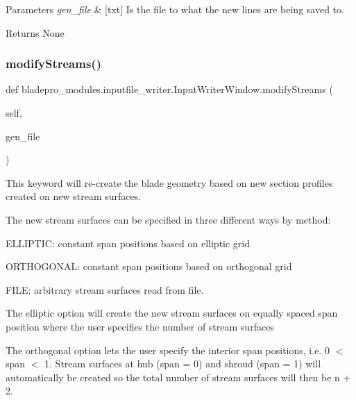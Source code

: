 \begin{DoxyParams}{Parameters}
{\em gen\+\_\+file} & \mbox{[}txt\mbox{]} Is the file to what the new lines are being saved to. \\
\hline
\end{DoxyParams}
\begin{DoxyReturn}{Returns}
None 
\end{DoxyReturn}
\hypertarget{a00073_a66f6209a0c4caa0ba5e25b5fd913eff5}{}\label{a00073_a66f6209a0c4caa0ba5e25b5fd913eff5} 
\subsubsection{\texorpdfstring{modify\+Streams()}{modifyStreams()}}
{\footnotesize\ttfamily def bladepro\+\_\+modules.\+inputfile\+\_\+writer.\+Input\+Writer\+Window.\+modify\+Streams (\begin{DoxyParamCaption}\item[{}]{self,  }\item[{}]{gen\+\_\+file }\end{DoxyParamCaption})}



This keyword will re-\/create the blade geometry based on new section profiles created on new stream surfaces. 

The new stream surfaces can be specified in three different ways by method\+:

\begin{DoxyItemize}
\item {\ttfamily E\+L\+L\+I\+P\+T\+IC\+:} constant span positions based on elliptic grid \item {\ttfamily O\+R\+T\+H\+O\+G\+O\+N\+AL\+:} constant span positions based on orthogonal grid \item {\ttfamily F\+I\+LE\+:} arbitrary stream surfaces read from file.\end{DoxyItemize}
The elliptic option will create the new stream surfaces on equally spaced span position where the user specifies the number of stream surfaces

The orthogonal option lets the user specify the interior span positions, i.\+e. 0 $<$ span $<$ 1. Stream surfaces at hub (span = 0) and shroud (span = 1) will automatically be created so the total number of stream surfaces will then be n + 2.

